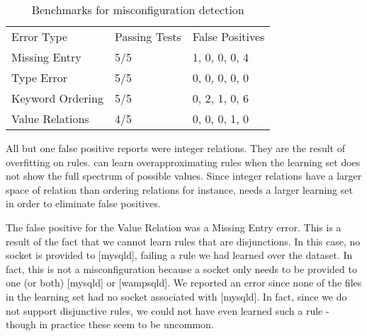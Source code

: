 \begin{table}[t]
\centering
\caption{Benchmarks for misconfiguration detection}
\label{table:res}
\begin{tabular}{l|l|l}
Error Type       & Passing Tests & False Positives  \\ \hhline{=|=|=}
Missing Entry    & 5/5           & 1, 0, 0, 0, 4        \\ \hline
Type Error       & 5/5           & 0, 0, 0, 0, 0          \\ \hline
Keyword Ordering & 5/5           & 0, 2, 1, 0, 6       \\ \hline
Value Relations  & 4/5           & 0, 0, 0, 1, 0        \\ 
\end{tabular}
\end{table}

All but one false positive reports were integer relations. They are the
result of overfitting on rules.
\app can learn overapproximating rules when the learning set does not show the full spectrum of possible values.
Since integer relations have a larger space of relation than ordering relations for instance, \app needs a larger learning set in order to eliminate false positives.

The false positive for the Value Relation was a Missing Entry error.
This is a result of the fact that we cannot learn rules that are disjunctions.
In this case, no socket is provided to [mysqld], failing a rule we had learned over the dataset.
In fact, this is not a misconfiguration because a socket only needs to be provided to one (or both) [mysqld] or [wampsqld].
We reported an error since none of the files in the learning set had no socket associated with [mysqld].
In fact, since we do not support disjunctive rules, we could not have even learned such a rule - though in practice these seem to be uncommon.

